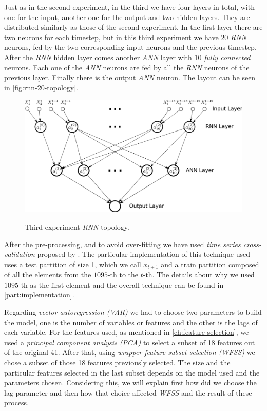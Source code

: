 Just as in the second experiment, in the third we have four layers in
total, with one for the input, another one for the output and two
hidden layers. They are distributed similarly as those of the second
experiment. In the first layer there are two neurons for each
timestep, but in this third experiment we have 20 \textit{RNN}
neurons, fed by the two corresponding input neurons and the previous
timestep. After the \textit{RNN} hidden layer comes another
\textit{ANN} layer with 10 \textit{fully connected} neurons. Each one
of the \textit{ANN} neurons are fed by all the \textit{RNN} neurons of
the previous layer. Finally there is the output \textit{ANN} neuron.
The layout can be seen in \autoref{fig:rnn-20-topology}.

\begin{figure}[bth]
  \myfloatalign
  {
    \includegraphics[width=1\linewidth]
    {gfx/rnn_20_topology}}
  \caption{Third experiment \textit{RNN} topology.}
  \label{fig:rnn-20-topology}
\end{figure}

After the pre-processing, and to avoid over-fitting we have used
\textit{time series cross-validation} proposed by
\cite{robjhyndman2010}. The particular implementation of this
technique used uses a test partition of size 1, which we call $x_{t +
1}$ and a train partition composed of all the elements from the
$1095$-th to the $t$-th. The details about why we used $1095$-th as
the first element and the overall technique can be found in
\autoref{part:implementation}.

Regarding \textit{vector autoregression (VAR)} we had to choose two
parameters to build the model, one is the number of variables or
features and the other is the lags of each variable. For the features
used, as mentioned in \autoref{ch:feature-selection}, we used a
\textit{principal component analysis (PCA)} to select a subset of 18
features out of the original 41. After that, using \textit{wrapper
feature subset selection (WFSS)} we chose a subset of those 18
features previously selected. The size and the particular features
selected in the last subset depends on the model used and the
parameters chosen. Considering this, we will explain first how did we
choose the lag parameter and then how that choice affected
\textit{WFSS} and the result of these process.

